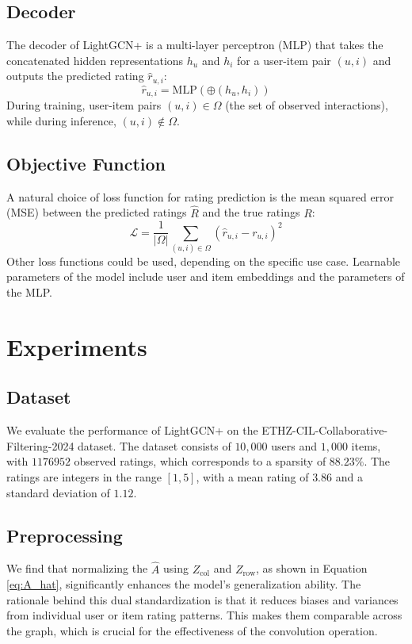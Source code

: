 \documentclass[10pt,conference,compsocconf]{IEEEtran}
\begin{document}
\subsection{Decoder}
The decoder of LightGCN+ is a multi-layer perceptron (MLP) that takes the concatenated hidden representations \( h_u \) and \( h_i \) for a user-item pair \((u, i)\) and outputs the predicted rating \(\hat{r}_{u,i}\):
\begin{equation}
    \hat{r}_{u,i} = \text{MLP}(\oplus(h_u, h_i))
\end{equation}
During training, user-item pairs \((u, i) \in \Omega\) (the set of observed interactions), while during inference, \((u, i) \notin \Omega\).

\subsection{Objective Function}
A natural choice of loss function for rating prediction is the mean squared error (MSE) between the predicted ratings \(\hat{R}\) and the true ratings \(R\):
\begin{equation}
    \mathcal{L} = \frac{1}{|\Omega|} \sum_{(u,i) \in \Omega} (\hat{r}_{u,i} - r_{u,i})^2
\end{equation}
Other loss functions could be used, depending on the specific use case.
Learnable parameters of the model include user and item embeddings and the parameters of the MLP.


\section{Experiments}

\subsection{Dataset}

We evaluate the performance of LightGCN+ on the ETHZ-CIL-Collaborative-Filtering-2024 dataset.
The dataset consists of $10,000$ users and $1,000$ items, with $1176952$ observed ratings, which corresponds to a sparsity of $88.23 \%$.
The ratings are integers in the range $[1, 5]$, with a mean rating of $3.86$ and a standard deviation of $1.12$.

\subsection{Preprocessing}
We find that normalizing the $\hat{A}$ using $Z_{\text{col}}$ and $Z_{\text{row}}$, as shown in Equation \ref{eq:A_hat}, significantly enhances the model's generalization ability. 
The rationale behind this dual standardization is that it reduces biases and variances from individual user or item rating patterns. This makes them comparable across the graph, which is crucial for the effectiveness of the convolution operation.
\end{document}
